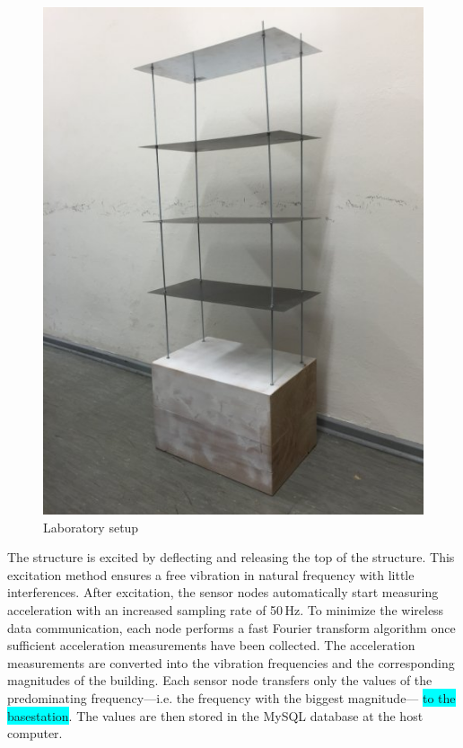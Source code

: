 \documentclass[12pt,a4paper]{scrartcl}
\begin{document}

\begin{figure}[h!]
    \centering
    \includegraphics[scale=0.4]{figures/teststructure.jpg}
    \caption{Laboratory setup}
    \label{fig:teststructure}
\end{figure}

The structure is excited by deflecting and releasing the top of the structure.
This excitation method ensures a free vibration in natural frequency with little interferences.
After excitation, the sensor nodes automatically start measuring acceleration with an increased sampling rate of 50\,Hz.
To minimize the wireless data communication, each node performs a fast Fourier transform algorithm once sufficient acceleration measurements have been collected.
The acceleration measurements are converted into the vibration frequencies and the corresponding magnitudes of the building.
Each sensor node transfers only the values of the predominating frequency---i.e. the frequency with the biggest magnitude--- \colorbox{cyan}{to the basestation}. 
The values are then stored in the MySQL database at the host computer.
\end{document}
